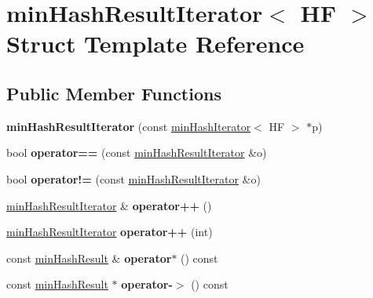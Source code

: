 \hypertarget{structminHashResultIterator}{}\section{min\+Hash\+Result\+Iterator$<$ HF $>$ Struct Template Reference}
\label{structminHashResultIterator}
\subsection*{Public Member Functions}
\begin{DoxyCompactItemize}
\item 
\mbox{\label{structminHashResultIterator_ac155e1df767ff5d26cc5bd47af1e9d32}} 
{\bfseries min\+Hash\+Result\+Iterator} (const \hyperlink{classminHashIterator}{min\+Hash\+Iterator}$<$ HF $>$ $\ast$p)
\item 
\mbox{\label{structminHashResultIterator_a290d89241a44c7313de6416007353b52}} 
bool {\bfseries operator==} (const \hyperlink{structminHashResultIterator}{min\+Hash\+Result\+Iterator} \&o)
\item 
\mbox{\label{structminHashResultIterator_a40507985bd12b8d9a4ead161cb669a78}} 
bool {\bfseries operator!=} (const \hyperlink{structminHashResultIterator}{min\+Hash\+Result\+Iterator} \&o)
\item 
\mbox{\label{structminHashResultIterator_a7049d4217b0de32552e2a8e0d501cac2}} 
\hyperlink{structminHashResultIterator}{min\+Hash\+Result\+Iterator} \& {\bfseries operator++} ()
\item 
\mbox{\label{structminHashResultIterator_ae53a12840643f6e9e2ce9bb0d44da007}} 
\hyperlink{structminHashResultIterator}{min\+Hash\+Result\+Iterator} {\bfseries operator++} (int)
\item 
\mbox{\label{structminHashResultIterator_a792959a201cd860f6b6c5f21269f1860}} 
const \hyperlink{structminHashResult}{min\+Hash\+Result} \& {\bfseries operator$\ast$} () const
\item 
\mbox{\label{structminHashResultIterator_ae8a8375942cbb2874de3356c8c133d3f}} 
const \hyperlink{structminHashResult}{min\+Hash\+Result} $\ast$ {\bfseries operator-\/$>$} () const
\end{DoxyCompactItemize}

